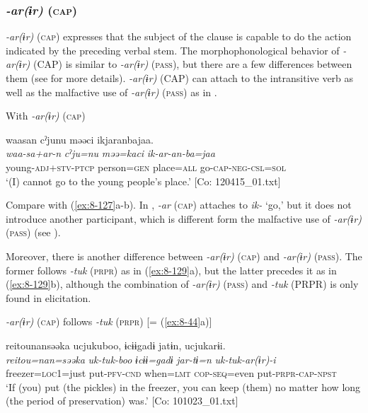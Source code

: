 \subsubsection{\textit{-ar(ɨr)} (\textsc{cap})}
\label{bkm:Ref366851018}
\textit{-ar(ɨr)} (\textsc{cap}) expresses that the subject of the clause is capable to do the action indicated by the preceding verbal stem. The morphophonological behavior of \textit{-ar(ɨr)} (CAP) is similar to \textit{-ar(ɨr)} (\textsc{pass}), but there are a few differences between them (see  for more details). \textit{-ar(ɨr)} (CAP) can attach to the intransitive verb as well as the malfactive use of \textit{-ar(ɨr)} (\textsc{pass}) as in .

\ea\label{ex:8-128}
  With \textit{-ar(ɨr)} (\textsc{cap})

  {\TM}
\glll  waasan  cˀjunu  məəci  ikjaranbajaa.\\
\textit{waa-sa+ar-n}  \textit{cˀju=nu}  \textit{məə=kaci}  \textit{ik-ar-an-ba=jaa}\\
    young-\textsc{adj}+\textsc{stv}-\textsc{ptcp}  person=\textsc{gen}  place=\textsc{all}  go-\textsc{cap}-\textsc{neg}-\textsc{csl}=\textsc{sol}\\
\glt ‘(I) cannot go to the young people’s place.’ [Co: 120415\_01.txt]
\z

Compare  with (\ref{ex:8-127}a-b). In , \textit{-ar} (\textsc{cap}) attaches to \textit{ik-} ‘go,’ but it does not introduce another participant, which is different form the malfactive use of \textit{-ar(ɨr)} (\textsc{pass}) (see ).

  Moreover, there is another difference between \textit{-ar(ɨr)} (\textsc{cap}) and \textit{-ar(ɨr)} (\textsc{pass}). The former follows \textit{-tuk} (\textsc{prpr}) as in (\ref{ex:8-129}a), but the latter precedes it as in (\ref{ex:8-129}b), although the combination of \textit{-ar(ɨr)} (\textsc{pass}) and \textit{-tuk} (PRPR) is only found in elicitation.

\ea\label{ex:8-129}
\ea \textit{-ar(ɨr)} (\textsc{cap}) follows \textit{-tuk} (\textsc{prpr}) [= (\ref{ex:8-44}a)]

  {\TM}
\glll  {\textbar}reitou{\textbar}nansəəka  ucjukuboo,  ɨcɨɨgadɨ  jatɨn,    ucjukarɨi.\\
\textit{reitou=nan=səəka}  \textit{uk-tuk-boo}  \textit{ɨcɨɨ=gadɨ}  \textit{jar-tɨ=n}    \textit{uk-tuk-ar(ɨr)-i}\\
    freezer=\textsc{loc1}=just  put-\textsc{pfv}-\textsc{cnd}  when=\textsc{lmt}  \textsc{cop}-\textsc{seq}=even put-\textsc{prpr}-\textsc{cap}-\textsc{npst}\\
\glt ‘If (you) put (the pickles) in the freezer, you can keep (them) no matter how long (the period of preservation) was.’ [Co: 101023\_01.txt]


